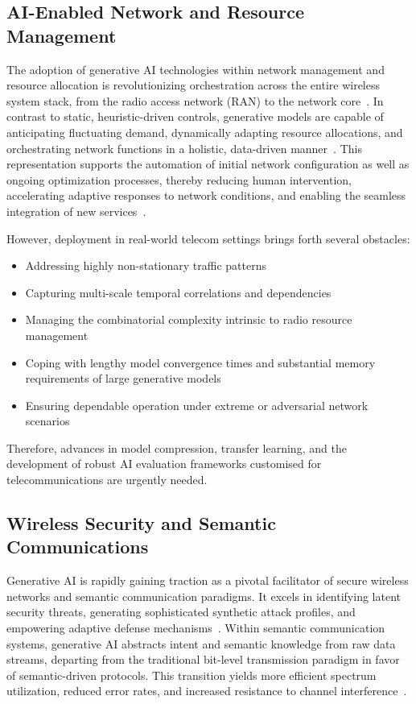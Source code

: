 \subsection{AI-Enabled Network and Resource Management}

The adoption of generative AI technologies within network management and resource allocation is revolutionizing orchestration across the entire wireless system stack, from the radio access network (RAN) to the network core~\cite{ref44}. In contrast to static, heuristic-driven controls, generative models are capable of anticipating fluctuating demand, dynamically adapting resource allocations, and orchestrating network functions in a holistic, data-driven manner~\cite{ref44,ref46}. This representation supports the automation of initial network configuration as well as ongoing optimization processes, thereby reducing human intervention, accelerating adaptive responses to network conditions, and enabling the seamless integration of new services~\cite{ref46}.

However, deployment in real-world telecom settings brings forth several obstacles:
\begin{itemize}
    \item Addressing highly non-stationary traffic patterns
    \item Capturing multi-scale temporal correlations and dependencies
    \item Managing the combinatorial complexity intrinsic to radio resource management
    \item Coping with lengthy model convergence times and substantial memory requirements of large generative models
    \item Ensuring dependable operation under extreme or adversarial network scenarios
\end{itemize}
Therefore, advances in model compression, transfer learning, and the development of robust AI evaluation frameworks customised for telecommunications are urgently needed.

\subsection{Wireless Security and Semantic Communications}

Generative AI is rapidly gaining traction as a pivotal facilitator of secure wireless networks and semantic communication paradigms. It excels in identifying latent security threats, generating sophisticated synthetic attack profiles, and empowering adaptive defense mechanisms~\cite{ref15,ref26,ref44}. Within semantic communication systems, generative AI abstracts intent and semantic knowledge from raw data streams, departing from the traditional bit-level transmission paradigm in favor of semantic-driven protocols. This transition yields more efficient spectrum utilization, reduced error rates, and increased resistance to channel interference~\cite{ref15,ref26,ref44}.

